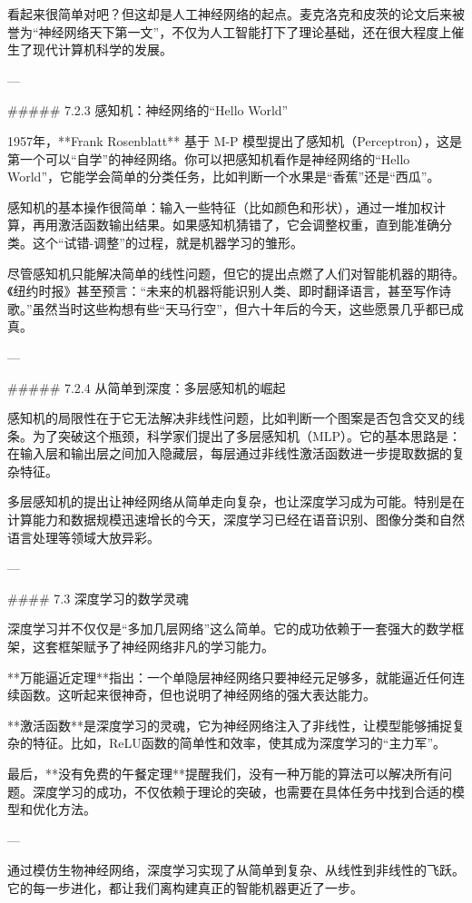 看起来很简单对吧？但这却是人工神经网络的起点。麦克洛克和皮茨的论文后来被誉为“神经网络天下第一文”，不仅为人工智能打下了理论基础，还在很大程度上催生了现代计算机科学的发展。

---

##### 7.2.3 感知机：神经网络的“Hello World”

1957年，**Frank Rosenblatt** 基于 M-P 模型提出了感知机（Perceptron），这是第一个可以“自学”的神经网络。你可以把感知机看作是神经网络的“Hello World”，它能学会简单的分类任务，比如判断一个水果是“香蕉”还是“西瓜”。

感知机的基本操作很简单：输入一些特征（比如颜色和形状），通过一堆加权计算，再用激活函数输出结果。如果感知机猜错了，它会调整权重，直到能准确分类。这个“试错-调整”的过程，就是机器学习的雏形。

尽管感知机只能解决简单的线性问题，但它的提出点燃了人们对智能机器的期待。《纽约时报》甚至预言：“未来的机器将能识别人类、即时翻译语言，甚至写作诗歌。”虽然当时这些构想有些“天马行空”，但六十年后的今天，这些愿景几乎都已成真。

---

##### 7.2.4 从简单到深度：多层感知机的崛起

感知机的局限性在于它无法解决非线性问题，比如判断一个图案是否包含交叉的线条。为了突破这个瓶颈，科学家们提出了多层感知机（MLP）。它的基本思路是：在输入层和输出层之间加入隐藏层，每层通过非线性激活函数进一步提取数据的复杂特征。

多层感知机的提出让神经网络从简单走向复杂，也让深度学习成为可能。特别是在计算能力和数据规模迅速增长的今天，深度学习已经在语音识别、图像分类和自然语言处理等领域大放异彩。

---

#### 7.3 深度学习的数学灵魂

深度学习并不仅仅是“多加几层网络”这么简单。它的成功依赖于一套强大的数学框架，这套框架赋予了神经网络非凡的学习能力。

**万能逼近定理**指出：一个单隐层神经网络只要神经元足够多，就能逼近任何连续函数。这听起来很神奇，但也说明了神经网络的强大表达能力。

**激活函数**是深度学习的灵魂，它为神经网络注入了非线性，让模型能够捕捉复杂的特征。比如，ReLU函数的简单性和效率，使其成为深度学习的“主力军”。

最后，**没有免费的午餐定理**提醒我们，没有一种万能的算法可以解决所有问题。深度学习的成功，不仅依赖于理论的突破，也需要在具体任务中找到合适的模型和优化方法。

---

通过模仿生物神经网络，深度学习实现了从简单到复杂、从线性到非线性的飞跃。它的每一步进化，都让我们离构建真正的智能机器更近了一步。